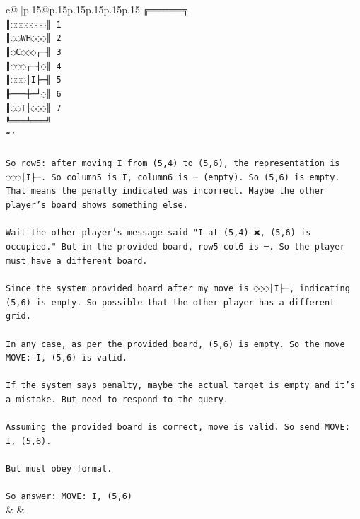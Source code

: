 \documentclass{article}
\begin{document}
{\begin{supertabular}{c@{$\;$}|p{.15\linewidth}@{}p{.15\linewidth}p{.15\linewidth}p{.15\linewidth}p{.15\linewidth}p{.15\linewidth}}
{{{\texttt{╔═══════╗} \\
\texttt{║◌◌◌◌◌◌◌║ 1} \\
\texttt{║◌◌WH◌◌◌║ 2} \\
\texttt{║◌C◌◌◌┌─╢ 3} \\
\texttt{║◌◌◌┌─┤◌║ 4} \\
\texttt{║◌◌◌│I├─╢ 5} \\
\texttt{╟───┼─┘◌║ 6} \\
\texttt{║◌◌T│◌◌◌║ 7} \\
\texttt{╚═══╧═══╝} \\
\texttt{```} \\
\\ 
\texttt{So row5: after moving I from (5,4) to (5,6), the representation is ◌◌◌│I├─. So column5 is I, column6 is ─ (empty). So (5,6) is empty. That means the penalty indicated was incorrect. Maybe the other player's board shows something else.} \\
\\ 
\texttt{Wait the other player's message said "I at (5,4) ❌, (5,6) is occupied." But in the provided board, row5 col6 is ─. So the player must have a different board.} \\
\\ 
\texttt{Since the system provided board after my move is ◌◌◌│I├─, indicating (5,6) is empty. So possible that the other player has a different grid.} \\
\\ 
\texttt{In any case, as per the provided board, (5,6) is empty. So the move MOVE: I, (5,6) is valid.} \\
\\ 
\texttt{If the system says penalty, maybe the actual target is empty and it's a mistake. But need to respond to the query.} \\
\\ 
\texttt{Assuming the provided board is correct, move is valid. So send MOVE: I, (5,6).} \\
\\ 
\texttt{But must obey format.} \\
\\ 
\texttt{So answer: MOVE: I, (5,6)} \\
            }
        }
    }
    & & \\ \\


\end{supertabular}}
\end{document}
